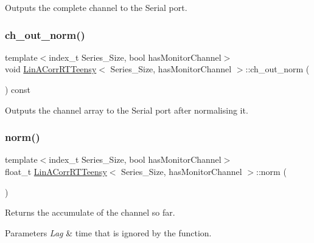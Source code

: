 Outputs the complete channel to the Serial port. 

\mbox{\label{classLinACorrRTTeensy_a4d1be65472a058b056386286d093b847}} 
\subsubsection{\texorpdfstring{ch\+\_\+out\+\_\+norm()}{ch\_out\_norm()}}
{\footnotesize\ttfamily template$<$index\+\_\+t Series\+\_\+\+Size, bool has\+Monitor\+Channel$>$ \\
void \hyperlink{classLinACorrRTTeensy}{Lin\+A\+Corr\+R\+T\+Teensy}$<$ Series\+\_\+\+Size, has\+Monitor\+Channel $>$\+::ch\+\_\+out\+\_\+norm (\begin{DoxyParamCaption}{ }\end{DoxyParamCaption}) const\hspace{0.3cm}{\ttfamily [inline]}}



Outputs the channel array to the Serial port after normalising it. 

\mbox{\label{classLinACorrRTTeensy_a98110e3b97a2300b9078a6e57a8234bc}} 
\subsubsection{\texorpdfstring{norm()}{norm()}}
{\footnotesize\ttfamily template$<$index\+\_\+t Series\+\_\+\+Size, bool has\+Monitor\+Channel$>$ \\
float\+\_\+t \hyperlink{classLinACorrRTTeensy}{Lin\+A\+Corr\+R\+T\+Teensy}$<$ Series\+\_\+\+Size, has\+Monitor\+Channel $>$\+::norm (\begin{DoxyParamCaption}{ }\end{DoxyParamCaption})\hspace{0.3cm}{\ttfamily [inline]}}



Returns the accumulate of the channel so far. 


\begin{DoxyParams}{Parameters}
{\em Lag} & time that is ignored by the function. \\
\hline
\end{DoxyParams}
\mbox{\label{classLinACorrRTTeensy_abf6a40dff92088469fbb8ceabf9da799}} 
